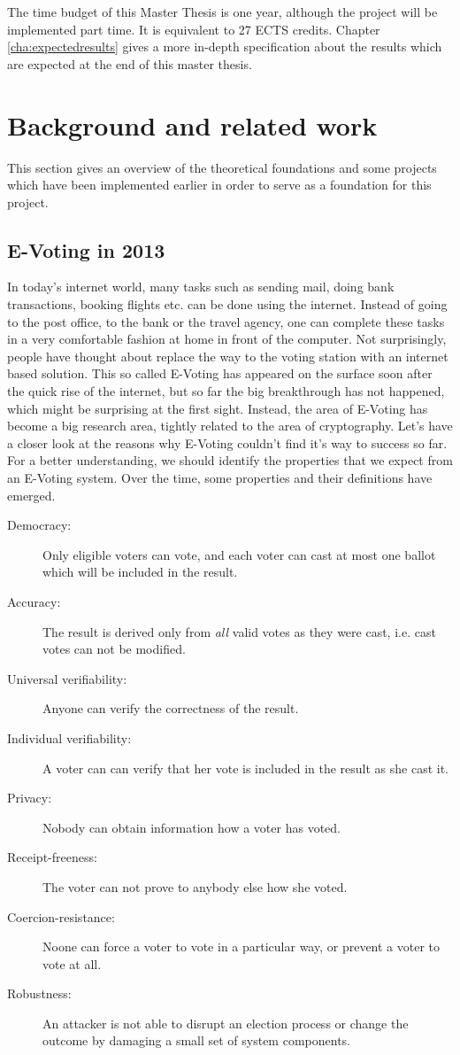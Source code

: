 \documentclass[numbers=noenddot, abstract=on, a4paper, headsepline,
footsepline, oneside, draft=off]{scrreprt}
\begin{document}
The time budget of this Master Thesis is one year, although the project will be
implemented part time. It is equivalent to 27 ECTS credits. Chapter
\vref{cha:expectedresults} gives a more in-depth specification about the results
which are expected at the end of this master thesis.

\chapter{Background and related work}
\label{cha:brw}
This section gives an overview of the theoretical foundations and some projects
which have been implemented earlier in order to serve as a foundation for this
project.

\section{E-Voting in 2013}
\label{sec:evoting}
In today's internet world, many tasks such as sending mail, doing bank
transactions, booking flights etc. can be done using the internet. Instead of
going to the post office, to the bank or the travel agency, one can complete
these tasks in a very comfortable fashion at home in front of the computer. Not
surprisingly, people have thought about replace the way to the voting station
with an internet based solution. This so called E-Voting has appeared on the
surface soon after the quick rise of the internet, but so far the big
breakthrough has not happened, which might be surprising at the first sight.
Instead, the area of E-Voting has become a big research area, tightly related to
the area of cryptography. Let's have a closer look at the reasons why E-Voting
couldn't find it's way to success so far. For a better understanding, we should
identify the properties that we expect from an E-Voting system. Over the time,
some properties and their definitions have emerged.

\begin{description}
  \item[Democracy:] Only eligible voters can vote, and each voter can
  cast at most one ballot which will be included in the result.
  \item[Accuracy:] The result is derived only from \emph{all} valid
  votes as they were cast, i.e. cast votes can not be modified.
  \item[Universal verifiability:] Anyone can verify the correctness of
  the result.
  \item[Individual verifiability:] A voter can can verify that her vote
  is included in the result as she cast it.
  \item[Privacy:] Nobody can obtain information how a voter has
  voted.
  \item[Receipt-freeness:] The voter can not prove to anybody else how
  she voted.
  \item[Coercion-resistance:] Noone can force a voter to vote in a
  particular way, or prevent a voter to vote at all.
  \item[Robustness:] An attacker is not able to disrupt an election
  process or change the outcome by damaging a small set of system components. 
\end{description}
\end{document}
